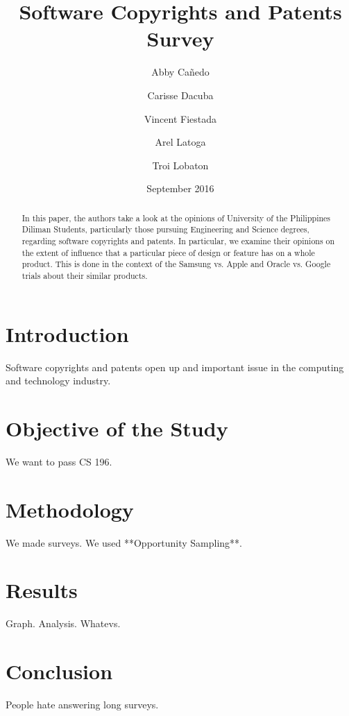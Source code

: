 \documentclass[a4paper,12pt]{article}
\title{Software Copyrights and Patents Survey}
\author{
Abby Cañedo\\
\and Carisse Dacuba\\
\and Vincent Fiestada\\
\and Arel Latoga\\ 
\and Troi Lobaton
}
\date{September 2016}
\begin{document}
\maketitle

\begin{abstract}
	In this paper, the authors take a look at the opinions of University of the Philippines Diliman Students, particularly those pursuing Engineering and Science degrees, regarding software copyrights and patents. In particular, we examine their opinions on the extent of influence that a particular piece of design or feature has on a whole product. This is done in the context of the Samsung vs. Apple and Oracle vs. Google trials about their similar products.
\end{abstract}

\section{Introduction}

Software copyrights and patents open up and important issue in the computing and technology industry. 

\section{Objective of the Study}

We want to pass CS 196.

\section{Methodology}

We made surveys. We used **Opportunity Sampling**.

\section{Results}

Graph. Analysis. Whatevs.

\section{Conclusion}

People hate answering long surveys.
\end{document}
